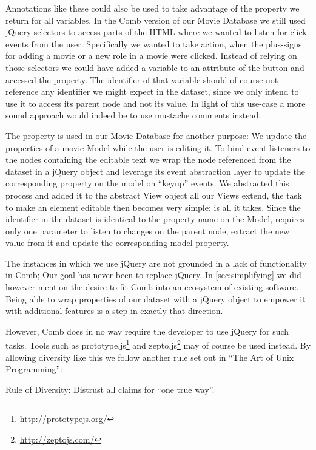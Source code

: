 \documentclass[thesis.tex]{subfiles}
\begin{document}
Annotations like these could also be used to take advantage of the
 property we return for all variables. In the Comb version
of our Movie Database we still used jQuery selectors to access parts of the HTML
where we wanted to listen for click events from the user. Specifically we wanted
to take action, when the plus-signs for adding a movie or a new role in a movie
were clicked.
Instead of relying on those selectors we could have added a variable to an
attribute of the button and accessed the  property.
The identifier of that variable should of course not reference any identifier we
might expect in the dataset, since we only intend to use it to access its parent
node and not its value.
In light of this use-case a more sound approach would indeed be to use mustache
comments instead.

The  property is used in our Movie Database for another
purpose: We update the properties of a movie Model while the user is editing it.
To bind event listeners to the nodes containing the editable text we wrap the
node referenced from the dataset in a jQuery object and leverage its event
abstraction layer to update the corresponding property on the model on ``keyup''
events. We abstracted this process and added it to the abstract View object
all our Views extend, the task to make an element editable then becomes very
simple:  is all it takes. Since the identifier in the
dataset is identical to the property name on the Model, 
requires only one parameter to listen to changes on the parent node, extract the
new value from it and update the corresponding model property.

The instances in which we use jQuery are not grounded in a lack of functionality
in Comb; Our goal has never been to replace jQuery.
In \ref{sec:simplifying} we did however mention the desire to fit Comb into an
ecosystem of existing software. Being able to wrap properties of our dataset
with a jQuery object to empower it with additional features is a step in exactly
that direction.

However, Comb does in no way require the developer to use jQuery for such tasks.
Tools such as prototype.js\footnote{\url{http://prototypejs.org/}} and
zepto.js\footnote{\url{http://zeptojs.com/}} may of course be used instead.
By allowing diversity like this we follow another rule set out in
``The Art of Unix Programming'':
\begin{citequote}{\cite[Chapter 1]{UXART}}
Rule of Diversity: Distrust all claims for ``one true way''.
\end{citequote}
\end{document}
